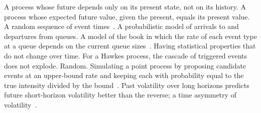 \begin{description}[leftmargin=1.2em,style=sameline,itemsep=1pt,font=\normalfont\bfseries]
 A process whose future depends only on its present state, not on its history.
 A process whose expected future value, given the present, equals its present value.
 A random sequence of event times~\citep{daley2003}.
 A probabilistic model of arrivals to and departures from queues.
 A model of the book in which the rate of each event type at a queue depends on the current queue sizes~\citep{huang2015}.
 Having statistical properties that do not change over time. For a Hawkes process,
  the cascade of triggered events does not explode.
 Random.
 Simulating a point process by proposing candidate events at an upper-bound rate and keeping each with probability equal to the true intensity divided by the bound~\citep{ogata1981}.
 Past volatility over long horizons predicts future short-horizon volatility better than the reverse; a time asymmetry of volatility~\citep{zumbach2009}.
\end{description}

